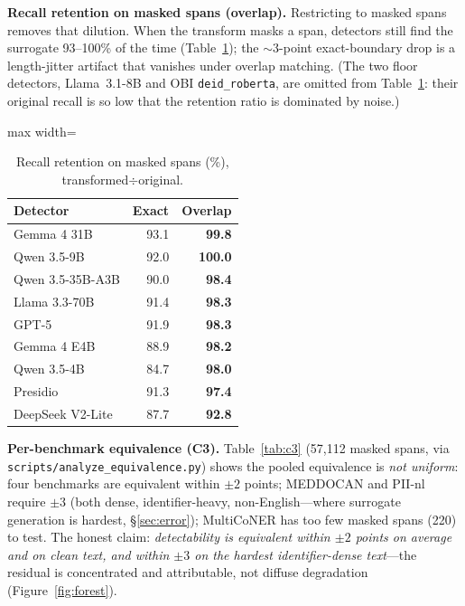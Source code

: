 \documentclass[pmlr,twocolumn,10pt]{jmlr}
\newcommand{\tp}[1]{\texttt{#1}}
\begin{document}
\textbf{Recall retention on masked spans (overlap).} Restricting to masked spans removes that dilution. When the transform masks a span, detectors still find the surrogate 93--100\% of the time (Table~\ref{tab:ret}); the $\sim$3-point exact-boundary drop is a length-jitter artifact that vanishes under overlap matching. (The two floor detectors, Llama~3.1-8B and OBI \tp{deid\_roberta}, are omitted from Table~\ref{tab:ret}: their original recall is so low that the retention ratio is dominated by noise.)

\begin{table}[t]\centering\small
\begin{adjustbox}{max width=\columnwidth}%
\begin{tabular}{lrr}
\toprule
Detector & Exact & Overlap\\
\midrule
Gemma 4 31B & 93.1 & \textbf{99.8}\\
Qwen 3.5-9B & 92.0 & \textbf{100.0}\\
Qwen 3.5-35B-A3B & 90.0 & \textbf{98.4}\\
Llama 3.3-70B & 91.4 & \textbf{98.3}\\
GPT-5 & 91.9 & \textbf{98.3}\\
Gemma 4 E4B & 88.9 & \textbf{98.2}\\
Qwen 3.5-4B & 84.7 & \textbf{98.0}\\
Presidio & 91.3 & \textbf{97.4}\\
DeepSeek V2-Lite & 87.7 & \textbf{92.8}\\
\bottomrule
\end{tabular}
\end{adjustbox}
\caption{Recall retention on masked spans (\%), transformed$\div$original.}\label{tab:ret}
\end{table}

\textbf{Per-benchmark equivalence (C3).} Table~\ref{tab:c3} (57{,}112 masked spans, via \tp{scripts/analyze\_equivalence.py}) shows the pooled equivalence is \emph{not uniform}: four benchmarks are equivalent within $\pm2$ points; MEDDOCAN and PII-nl require $\pm3$ (both dense, identifier-heavy, non-English---where surrogate generation is hardest, \S\ref{sec:error}); MultiCoNER has too few masked spans (220) to test. The honest claim: \emph{detectability is equivalent within $\pm2$ points on average and on clean text, and within $\pm3$ on the hardest identifier-dense text}---the residual is concentrated and attributable, not diffuse degradation (Figure~\ref{fig:forest}).
\end{document}
